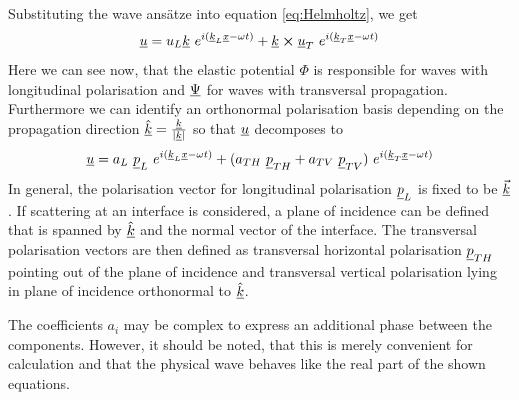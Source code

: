 Substituting the wave ansätze into equation \ref{eq:Helmholtz}, we get
\begin{equation}
    \uline{u} = u_L \uline{k}\	e^{i(\uline{k}_L\uline{x}-\omega t)}
    + \uline{k} \cross \uline{u}_T\ e^{i(\uline{k}_T\uline{x}-\omega t)}
\end{equation}
Here we can see now, that the elastic potential $\Phi$ is responsible for waves
with longitudinal polarisation and $\underline{\Psi}$ for waves with transversal
propagation. Furthermore we can identify an orthonormal polarisation basis
depending on the propagation direction $\underline{\hat{k}} =
    \frac{\underline{k}}{|\underline{k}|}$ so that $\underline{u}$ decomposes to
\begin{equation}
    \uline{u} = a_L \ \uline{p}_L\	e^{i(\uline{k}_L\uline{x}-\omega
            t)}
    + (a_{TH}\ \uline{p}_{TH} + a_{TV}\ \uline{p}_{TV})\
    e^{i(\uline{k}_T\uline{x}-\omega t)}
\end{equation}
In general, the polarisation vector for longitudinal polarisation
$\underline{p}_L$ is fixed to be $\underline{\vec{k}}$. If scattering at an interface
is considered, a plane of incidence can be defined that is spanned by
$\underline{\hat{k}}$ and the normal vector of the interface. The transversal
polarisation vectors are then defined as transversal horizontal polarisation
$\underline{p}_{TH}$ pointing out of the plane of incidence and transversal
vertical polarisation lying in plane of incidence orthonormal to
$\underline{\hat{k}}$.

The coefficients $a_i$ may be complex to express an additional phase between
the components. However, it should be noted, that this is merely convenient for
calculation and that the physical wave behaves like the real part of the shown
equations.


